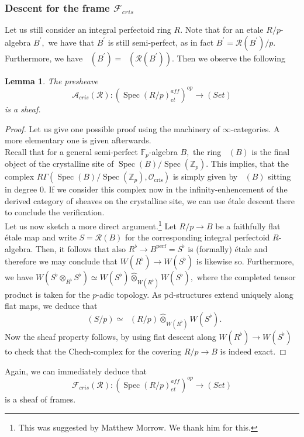 \documentclass[a4paper,10,5 pt]{amsart}
\newtheorem{Lemma}[Satz]{Lemma}
\theoremstyle{definition}
\DeclareMathOperator{\Spec}{Spec}
\DeclareMathOperator{\Acris}{\mathbb{A}_{cris}}
\begin{document}
\subsubsection{Descent for the frame $\mathcal{F}_{cris}$}
Let us still consider an integral perfectoid ring $R.$ Note that for an etale $R/p$-algebra $B^{\prime},$ we have that $B^{\prime}$ is still semi-perfect, as in fact $B^{\prime}=\mathcal{R}(B^{\prime})/p.$ Furthermore, we have $\Acris(B^{\prime})=\Acris(\mathcal{R}(B^{\prime})).$ Then we observe the following
\begin{Lemma}
The presheave
$$
\mathcal{A}_{cris}(\mathcal{R})\colon (\Spec(R/p)^{aff}_{et})^{op}\rightarrow (Set)
$$
is a sheaf.
\end{Lemma}
\begin{proof}
Let us give one possible proof using the machinery of $\infty$-categories. A more elementary one is given afterwards.
\\
Recall that for a general semi-perfect $\mathbb{F}_{p}$-algebra $B,$ the ring $\Acris(B)$ is the final object of the crystalline site of $\Spec(B)/\Spec(\mathbb{Z}_{p}).$ This implies, that the complex $R\Gamma(\Spec(B)/\Spec(\mathbb{Z}_{p}),\mathcal{O}_{\text{cris}})$ is simply given by $\Acris(B)$ sitting in degree $0.$ If we consider this complex now in the infinity-enhencement of the derived category of sheaves on the crystalline site, we can use étale descent there to conclude the verification.
\\
Let us now sketch a more direct argument.\footnote{This was suggested by Matthew Morrow. We thank him for this.} Let $R/p\rightarrow B$ be a faithfully flat étale map and write $S=\mathcal{R}(B)$ for the corresponding integral perfectoid $R$-algebra. Then, it follows that also $R^{\flat}\rightarrow B^{\text{perf}}=S^{\flat}$ is (formally) étale and therefore we may conclude that $W(R^{\flat})\rightarrow W(S^{\flat})$ is likewise so. Furthermore, we have $W(S^{\flat}\otimes_{R^{\flat}} S^{\flat})\simeq W(S^{\flat})\hat{\otimes}_{W(R^{\flat})} W(S^{\flat}),$ where the completed tensor product is taken for the $p$-adic topology. As pd-structures extend uniquely along flat maps, we deduce that
$$
\Acris(S/p)\simeq \Acris(R/p)\hat{\otimes}_{W(R^{\flat})} W(S^{\flat}).
$$
Now the sheaf property follows, by using flat descent along $W(R^{\flat})\rightarrow W(S^{\flat})$ to check that the Chech-complex for the covering $R/p\rightarrow B$ is indeed exact.
\end{proof}
Again, we can immediately deduce that
$$
\mathcal{F}_{cris}(\mathcal{R})\colon  (\Spec(R/p)^{aff}_{et})^{op}\rightarrow (Set)
$$
is a sheaf of frames.
\end{document}
